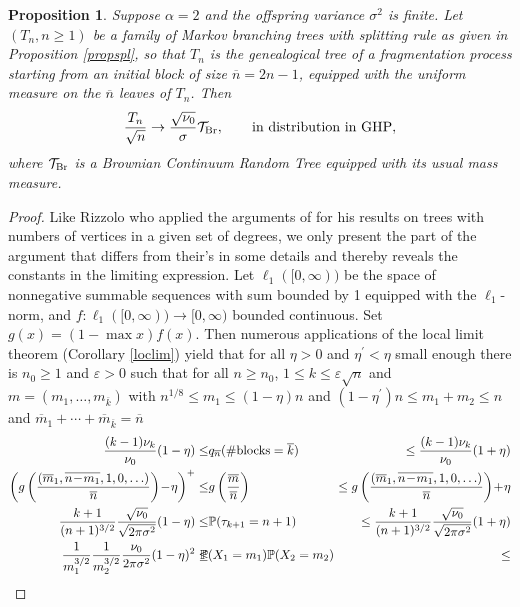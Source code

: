 \documentclass[11pt,a4paper]{article}
\newtheorem{prop}{Proposition}[section]
\newcommand{\bP}{\mathbb{P}}
\newcommand{\cT}{\mathcal{T}}
\begin{document}
\begin{prop}\label{cutmb} Suppose $\alpha=2$ and the offspring variance $\sigma^2$ is finite. Let $(T_n,n\ge 1)$ be a family of Markov branching trees with splitting rule as given in Proposition \ref{propspl}, so that $T_n$ is the genealogical tree of a fragmentation process starting from an initial block of size $\overline{n}=2n-1$,
equipped with the uniform measure on the $\overline{n}$ leaves of $T_n$. Then
  $$\frac{T_n}{\sqrt{n}}\rightarrow%
                                    \frac{\sqrt{\nu_0}}{\sigma}\cT_{\rm Br},\qquad\mbox{in distribution in GHP},$$
where $\cT_{\rm Br}$ is a Brownian Continuum Random Tree equipped with its usual mass measure.
\end{prop}
\begin{proof} Like Rizzolo \cite{Riz13} who applied the arguments of \cite[Section 5.1]{HM10} for his results on trees with numbers of vertices in a given set of degrees, we only present the part of the argument that differs from their's in some details and thereby reveals the constants in the limiting expression. Let $\ell_1([0,\infty))$ be the space of nonnegative summable sequences with sum bounded by 1 equipped with the $\ell_1$-norm, and $f\colon\ell_1([0,\infty))\rightarrow[0,\infty)$ bounded continuous. Set $g(x)=(1-\max x)f(x)$. Then numerous applications of the local limit theorem (Corollary \ref{loclim}) yield that for all $\eta>0$ and $\eta^\prime<\eta$ small enough there is $n_0\ge 1$ and $\varepsilon>0$ such that for all $n\ge n_0$, $1\le k\le\varepsilon\sqrt{n}$ and $m=(m_1,\ldots,m_{\overline{k}})$ with $n^{1/8}\le m_1\le(1-\eta)n$ and $(1-\eta^\prime)n\le m_1+m_2\le n$ and $\overline{m}_1+\cdots+\overline{m}_{\overline{k}}=\overline{n}$
\begin{eqnarray*}\frac{(k-1)\nu_k}{\nu_0}(1-\eta)\le &q_{\overline{n}}(\#{\rm blocks}=\overline{k})&\le\frac{(k-1)\nu_k}{\nu_0}(1+\eta)\\
\left(g\left(\frac{(\overline{m}_1,\overline{n\!-\!m_1},1,0,\ldots)}{\overline{n}}\right)\!-\!\eta\right)^+\le &g\left(\frac{\overline{m}}{\overline{n}}\right)& \le g\left(\frac{(\overline{m}_1,\overline{n\!-\!m_1},1,0,\ldots)}{\overline{n}}\right)\!+\!\eta\\
\frac{k+1}{(n+1)^{3/2}}\frac{\sqrt{\nu_0}}{\sqrt{2\pi\sigma^2}}(1-\eta)\le &\bP(\tau_{k+1}=n+1)&\le\frac{k+1}{(n+1)^{3/2}}\frac{\sqrt{\nu_0}}{\sqrt{2\pi\sigma^2}}(1+\eta)\\
\frac{1}{m_1^{3/2}}\frac{1}{m_2^{3/2}}\frac{\nu_0}{2\pi\sigma^2}(1-\eta)^2\le &\!\!\!\!\bP(X_1=m_1)\bP(X_2=m_2)\!\!\!\!&\le

\end{eqnarray*}
\end{proof}
\end{document}
